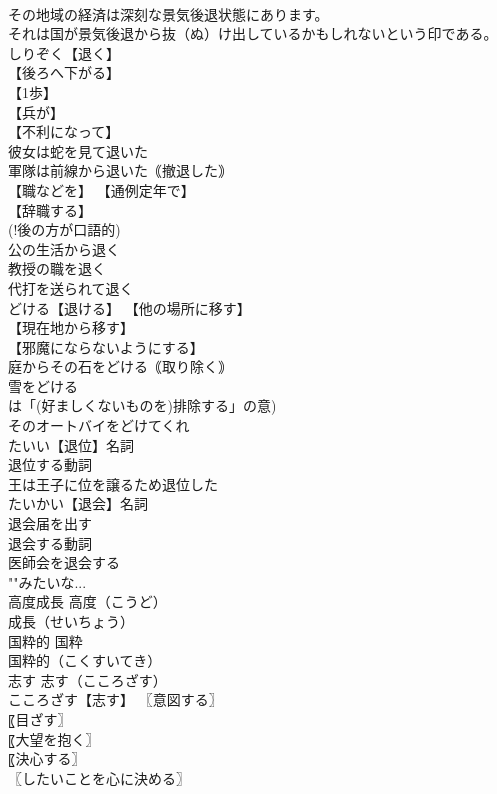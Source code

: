 \documentclass[8pt]{extreport}
\begin{document}
\begin{CJK}{UTF8}{min}
\\	その地域の経済は深刻な景気後退状態にあります。 
\\	それは国が景気後退から抜（ぬ）け出しているかもしれないという印である。 
\\	しりぞく【退く】 
\\	【後ろへ下がる】 
\\	【1歩】
\\	【兵が】
\\	【不利になって】
\\	彼女は蛇を見て退いた 
\\	軍隊は前線から退いた｟撤退した｠ 
\\	【職などを】 【通例定年で】
\\	【辞職する】
\\	(!後の方が口語的) 
\\	公の生活から退く 
\\	教授の職を退く 
\\	代打を送られて退く 
\\	どける【退ける】 【他の場所に移す】
\\	【現在地から移す】
\\	【邪魔にならないようにする】
\\	庭からその石をどける｟取り除く｠ 
\\	雪をどける 
\\	は「(好ましくないものを)排除する」の意) 
\\	そのオートバイをどけてくれ 
\\	たいい【退位】名詞 
\\	退位する動詞 
\\	王は王子に位を譲るため退位した 
\\	たいかい【退会】名詞 
\\	退会届を出す 
\\	退会する動詞 
\\	医師会を退会する 
\\	""みたいな...
\\	高度成長		高度（こうど）
\\	成長（せいちょう） 
\\	国粋的		国粋　
\\	国粋的（こくすいてき） 
\\	志す		志す（こころざす） 
\\	こころざす【志す】 〖意図する〗
\\	〖目ざす〗
\\	〖大望を抱く〗
\\	〖決心する〗
\\	〖したいことを心に決める〗

\end{CJK}
\end{document}
